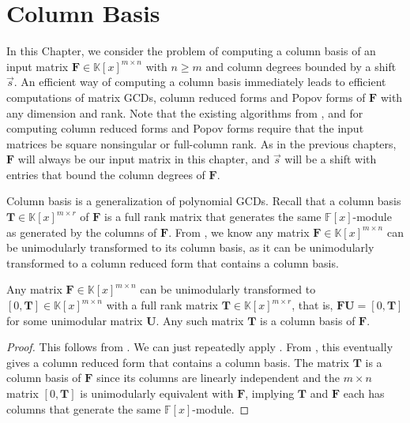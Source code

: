 
\chapter{\label{chap:Matrix-GCD}Column Basis}

In this Chapter, we consider the problem of computing a column basis
of an input matrix $\mathbf{F}\in\mathbb{K}\left[x\right]^{m\times n}$
with $n\ge m$ and column degrees bounded by a shift $\vec{s}$. An
efficient way of computing a column basis immediately leads to efficient
computations of matrix GCDs, column reduced forms and Popov forms
of $\mathbf{F}$ with any dimension and rank. Note that the existing
algorithms from \citet{Giorgi2003}, \citet{GSSV2012} and \citet{SS2011}
for computing column reduced forms and Popov forms require that the
input matrices be square nonsingular or full-column rank. As in the
previous chapters, $\mathbf{F}$ will always be our input matrix in
this chapter, and $\vec{s}$ will be a shift with entries that bound
the column degrees of $\mathbf{F}$.

Column basis is a generalization of polynomial GCDs. Recall that a
column basis $\mathbf{T}\in\mathbb{K}\left[x\right]^{m\times r}$
of $\mathbf{F}$ is a full rank matrix that generates the same $\mathbb{F}\left[x\right]$-module
as generated by the columns of $\mathbf{F}$. From ,
we know any matrix $\mathbf{F}\in\mathbb{K}\left[x\right]^{m\times n}$
can be unimodularly transformed to its column basis, as it can be
unimodularly transformed to a column reduced form that contains a
column basis.
\begin{lem}
\label{lem:unimodularlyReduceToColumnBasis}Any matrix $\mathbf{F}\in\mathbb{K}\left[x\right]^{m\times n}$
can be unimodularly transformed to $\left[0,\mathbf{T}\right]\in\mathbb{K}\left[x\right]^{m\times n}$
with a full rank matrix $\mathbf{T}\in\mathbb{K}\left[x\right]^{m\times r}$,
that is, $\mathbf{F}\mathbf{U}=\left[0,\mathbf{T}\right]$ for some
unimodular matrix $\mathbf{U}$. Any such matrix $\mathbf{T}$ is
a column basis of $\mathbf{F}$.\end{lem}
\begin{proof}
This follows from . We can just repeatedly
apply . From ,
this eventually gives a column reduced form that contains a column
basis. The matrix $\mathbf{T}$ is a column basis of $\mathbf{F}$
since its columns are linearly independent and the $m\times n$ matrix
$\left[0,\mathbf{T}\right]$ is unimodularly equivalent with $\mathbf{F}$,
implying $\mathbf{T}$ and $\mathbf{F}$ each has columns that generate
the same $\mathbb{F}\left[x\right]$-module.
\end{proof}


